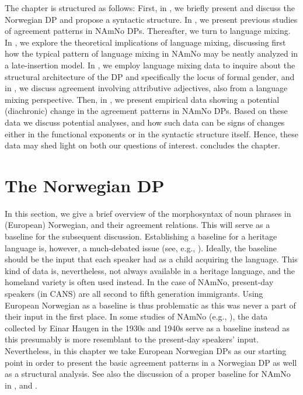 \documentclass[output=paper]{langscibook}
\begin{document}
The chapter is structured as follows: First, in , we briefly present and discuss the Norwegian DP and propose a syntactic structure. In , we present previous studies of agreement patterns in NAmNo DPs. Thereafter, we turn to language mixing. In , we explore the theoretical implications of language mixing, discussing first how the typical pattern of language mixing in NAmNo may be neatly analyzed in a late-insertion model. In , we employ language mixing data to inquire about the structural architecture of the DP and specifically the locus of formal gender, and in , we discuss agreement involving attributive adjectives, also from a language mixing perspective. Then, in , we present empirical data showing a potential (diachronic) change in the agreement patterns in NAmNo DPs. Based on these data we discuss potential analyses, and how such data can be signs of changes either in the functional exponents or in the syntactic structure itself. Hence, these data may shed light on both our questions of interest.  concludes the chapter. 


\section{The Norwegian DP}\label{sec:riksem:2}

In this section, we give a brief overview of the morphosyntax of noun phrases in (European) Norwegian, and their agreement relations. This will serve as a baseline for the subsequent discussion. Establishing a baseline for a heritage language is, however, a much-debated issue (see, e.g., \citealt{Montrul2016, Polinsky2018, Lohndal2021, D'AlessandroEtAl2021}). Ideally, the baseline should be the input that each speaker had as a child acquiring the language. This kind of data is, nevertheless, not always available in a heritage language, and the homeland variety is often used instead. In the case of NAmNo, present-day speakers (in CANS) are all second to fifth generation immigrants. Using European Norwegian as a baseline is thus problematic as this was never a part of their input in the first place. In some studies of NAmNo (e.g., \citealt{Riksem2017}), the data collected by Einar Haugen in the 1930s and 1940s serve as a baseline instead as this presumably is more resemblant to the present-day speakers’ input. Nevertheless, in this chapter we take European Norwegian DPs as our starting point in order to present the basic agreement patterns in a Norwegian DP as well as a structural analysis. See also the discussion of a proper baseline for NAmNo in ,  and .  
\end{document}
